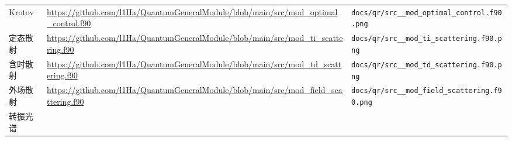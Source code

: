 \documentclass[
  a4paper,
]{ctexbook}
\begin{document}
\begin{longtable}[]{@{}lll@{}}
\begin{minipage}[t]{0.30\columnwidth}\raggedright
Krotov\strut
\end{minipage} & \begin{minipage}[t]{0.30\columnwidth}\raggedright
\url{https://github.com/l1Ha/QuantumGeneralModule/blob/main/src/mod_optimal_control.f90}\strut
\end{minipage} & \begin{minipage}[t]{0.30\columnwidth}\raggedright
\texttt{docs/qr/src\_\_mod\_optimal\_control.f90.png}\strut
\end{minipage}\tabularnewline
\begin{minipage}[t]{0.30\columnwidth}\raggedright
定态散射\strut
\end{minipage} & \begin{minipage}[t]{0.30\columnwidth}\raggedright
\url{https://github.com/l1Ha/QuantumGeneralModule/blob/main/src/mod_ti_scattering.f90}\strut
\end{minipage} & \begin{minipage}[t]{0.30\columnwidth}\raggedright
\texttt{docs/qr/src\_\_mod\_ti\_scattering.f90.png}\strut
\end{minipage}\tabularnewline
\begin{minipage}[t]{0.30\columnwidth}\raggedright
含时散射\strut
\end{minipage} & \begin{minipage}[t]{0.30\columnwidth}\raggedright
\url{https://github.com/l1Ha/QuantumGeneralModule/blob/main/src/mod_td_scattering.f90}\strut
\end{minipage} & \begin{minipage}[t]{0.30\columnwidth}\raggedright
\texttt{docs/qr/src\_\_mod\_td\_scattering.f90.png}\strut
\end{minipage}\tabularnewline
\begin{minipage}[t]{0.30\columnwidth}\raggedright
外场散射\strut
\end{minipage} & \begin{minipage}[t]{0.30\columnwidth}\raggedright
\url{https://github.com/l1Ha/QuantumGeneralModule/blob/main/src/mod_field_scattering.f90}\strut
\end{minipage} & \begin{minipage}[t]{0.30\columnwidth}\raggedright
\texttt{docs/qr/src\_\_mod\_field\_scattering.f90.png}\strut
\end{minipage}\tabularnewline
\begin{minipage}[t]{0.30\columnwidth}\raggedright
转振光谱\strut
\end{minipage} & \begin{minipage}[t]{0.30\columnwidth}\raggedright

\end{minipage}
\end{longtable}
\end{document}

